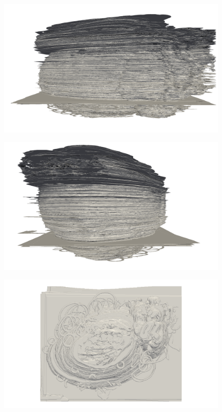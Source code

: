 \begin{figure}
  \centering
  \includegraphics[width=0.9\textheight]{Ch7/Figs/Rat28/contours/whole_negative_x_affine}
  \caption{}
  \label{fig:image1.png}
\end{figure}

\begin{figure}
  \centering
  \includegraphics[width=0.9\textheight]{Ch7/Figs/Rat28/contours/whole_positive_y_affine}
  \caption{}
  \label{fig:image1.png}
\end{figure}

\begin{figure}
  \centering
  \includegraphics[width=0.9\textheight]{Ch7/Figs/Rat28/contours/whole_positive_z_affine}
  \caption{}
  \label{fig:image1.png}
\end{figure}


